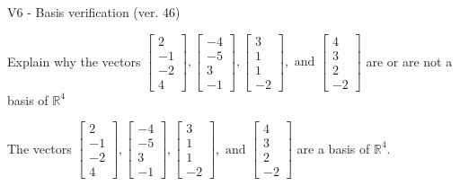 \begin{exercise}
  \begin{exerciseTitle}V6 - Basis verification (ver. 46)\end{exerciseTitle}
  \begin{exerciseStatement}
    Explain why the vectors \(\left[\begin{array}{r}
2 \\
-1 \\
-2 \\
4
\end{array}\right] , \left[\begin{array}{r}
-4 \\
-5 \\
3 \\
-1
\end{array}\right] , \left[\begin{array}{r}
3 \\
1 \\
1 \\
-2
\end{array}\right] , \text{ and } \left[\begin{array}{r}
4 \\
3 \\
2 \\
-2
\end{array}\right]\) are or are not a basis of \(\mathbb{R}^4\)	


  \end{exerciseStatement}
  \begin{exerciseAnswer}
   The vectors \(\left[\begin{array}{r}
2 \\
-1 \\
-2 \\
4
\end{array}\right] , \left[\begin{array}{r}
-4 \\
-5 \\
3 \\
-1
\end{array}\right] , \left[\begin{array}{r}
3 \\
1 \\
1 \\
-2
\end{array}\right] , \text{ and } \left[\begin{array}{r}
4 \\
3 \\
2 \\
-2
\end{array}\right]\) 
  	 are  a basis of \(\mathbb{R}^4\).
  


  \end{exerciseAnswer}
\end{exercise}